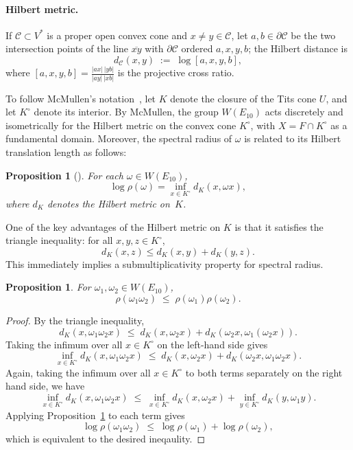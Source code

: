 \documentclass[11pt]{amsart}
\numberwithin{equation}{section}
\newtheorem{prop}[thm]{Proposition}
\begin{document}
\medskip

\paragraph{Hilbert metric.}
If $\mathcal{C}\subset V^*$ is a proper open convex cone and $x\neq y\in \mathcal{C}$, let $a,b\in\partial \mathcal{C}$ be the two intersection points of the line $\overline{xy}$ with $\partial \mathcal{C}$ ordered $a,x,y,b$; the Hilbert distance is
\[
d_\mathcal{C}(x,y)\;:=\;\log [a,x,y,b],
\]
where $[a,x,y,b]=\frac{|ax|\,|yb|}{|ay|\,|xb|}$ is the projective cross ratio.


\medskip
To follow McMullen's notation~\cite{McMullen:2002}, let $K$ denote the closure 
of the Tits cone $U$, and let $K^\circ$ denote its interior. 
By McMullen, the group $W(E_{10})$ acts discretely and isometrically 
for the Hilbert metric on the convex cone $K^\circ$, with 
$X = F \cap K^\circ$ as a fundamental domain.
Moreover, the spectral radius of $\omega$ is related to its 
Hilbert translation length as follows:

\begin{prop}[{\cite[Cor.~3.5]{McMullen:2002}}]\label{P:logSp}
For each $\omega\in W(E_{10})$,
\[
\log\rho(\omega)
= \inf_{x\in K^\circ} d_K(x,\omega x),
\]
where $d_K$ denotes the Hilbert metric on~$K$.
\end{prop}

One of the key advantages of the Hilbert metric on $K$ is that it satisfies the triangle inequality: for all $x,y,z \in K^\circ$,
\[ d_K(x,z) \le d_K(x,y) + d_K(y,z).\]
This immediately implies a submultiplicativity property for spectral radius. 

\begin{prop}\label{P:sub-mul}
For $\omega_1, \omega_2 \in W(E_10)$, 
\[ \rho(\omega_1 \omega_2) \;\le\; \rho(\omega_1) \rho(\omega_2).\]
\end{prop}

\begin{proof}
By the triangle inequality, \[ d_K(x, \omega_1\omega_2 x) \;\le\; d_K(x, \omega_2 x) + d_K(\omega_2 x, \omega_1( \omega_2 x)).\] 
Taking the infimum over all $x\in K^\circ$ on the left-hand side gives
\[ \inf_{x \in K^\circ} d_K(x, \omega_1\omega_2 x) \;\le \; d_K(x, \omega_2 x) + d_K(\omega_2 x, \omega_1 \omega_2 x).\] 
Again, taking the infimum  over all $x \in K^\circ$ to both terms separately on the right hand side, we have 
\[\inf_{x \in K^\circ} d_K(x, \omega_1\omega_2 x) \;\le \; \inf_{x \in K^\circ} d_K(x, \omega_2 x) + \inf_{y \in K^\circ} d_K(y, \omega_1 y).\]
Applying Proposition~\ref{P:logSp} to each term gives 
\[  \log \rho(\omega_1 \omega_2)\; \le\; \log \rho(\omega_1) + \log\rho(\omega_2),\] which is equivalent to the desired ineqaulity.
\end{proof}
\end{document}
